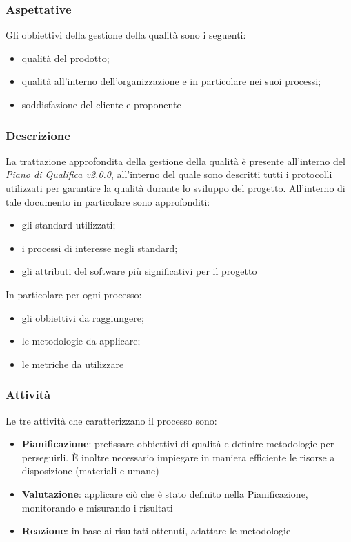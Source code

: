 		\subsubsection{Aspettative}
		Gli obbiettivi della gestione della qualità sono i seguenti:
		\begin{itemize}
			\item qualità del prodotto;
			\item qualità all'interno dell'organizzazione e in particolare nei suoi processi;
			\item soddisfazione del cliente e proponente
		\end{itemize}
		
		\subsubsection{Descrizione}
		La trattazione approfondita della gestione della qualità è presente all'interno del \textit{Piano di Qualifica v2.0.0}, all'interno del quale sono descritti tutti i protocolli utilizzati per garantire la qualità durante lo sviluppo del progetto. All'interno di tale documento in particolare sono approfonditi:
		\begin{itemize}
			\item gli standard utilizzati;
			\item i processi di interesse negli standard;
			\item gli attributi del software più significativi per il progetto
		\end{itemize}
		In particolare per ogni processo:
		\begin{itemize}
			\item gli obbiettivi da raggiungere;
			\item le metodologie da applicare;
			\item le metriche da utilizzare
		\end{itemize}
		
		\subsubsection{Attività}
		Le tre attività che caratterizzano il processo sono:
		\begin{itemize}
			\item \textbf{Pianificazione}: prefissare obbiettivi di qualità e definire metodologie per perseguirli. È inoltre necessario impiegare in maniera efficiente le risorse a disposizione (materiali e umane)
			\item \textbf{Valutazione}: applicare ciò che è stato definito nella Pianificazione, monitorando e misurando i risultati
			\item \textbf{Reazione}: in base ai risultati ottenuti, adattare le metodologie
		\end{itemize}
		

